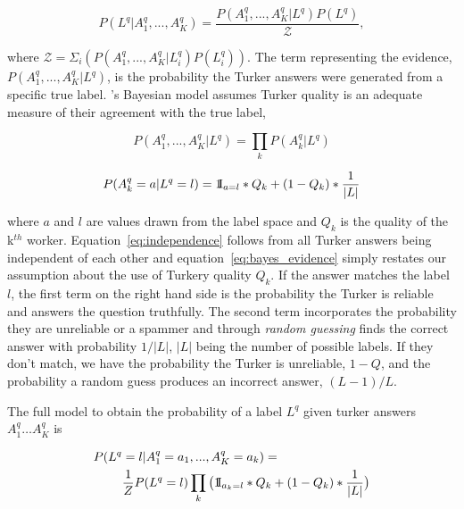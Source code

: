 \begin{equation}
P(L^{q}|A^{q}_{1},...,A^{q}_{K}) = \frac{P(A^{q}_{1},...,A^{q}_{K}|L^{q})P(L^{q})}{\mathcal{Z}},
\end{equation}

where $\mathcal{Z} = \Sigma_{i}(P(A^{q}_{1},...,A^{q}_{K}|L_{i}^{q})P(L_{i}^{q}))$.  The term representing the evidence, $P(A^{q}_{1},...,A^{q}_{K}|L^{q})$, is the probability the Turker answers were generated from a specific true label.  \sysName's Bayesian model assumes Turker quality is an adequate measure of their agreement with the true label,

\begin{equation}
\label{eq:independence}
P(A^{q}_{1},...,A^{q}_{K}|L^{q}) = \prod_{k}P(A^{q}_{k}|L^{q})
\end{equation}

\begin{equation}
\label{eq:bayes_evidence}
P(A^{q}_{k}=a|L^{q}=l) = 1{\hskip -2.5 pt}\hbox{I}_{{a}= l}* Q_{k} + (1-Q_{k})*\frac{1}{|L|}
\end{equation}

where $a$ and $l$ are values drawn from the label space and $Q_{k}$ is the quality of the k$^{th}$ worker.  Equation~\ref{eq:independence} follows from all Turker answers being independent of each other and equation~\ref{eq:bayes_evidence} simply restates our assumption about the use of Turkery quality $Q_{k}$.  If the answer matches the label $l$, the first term on the right hand side is the probability the Turker is reliable and answers the question truthfully.  The second term incorporates the probability they are unreliable or a spammer and through \textit{random guessing} finds the correct answer with probability $1/|L|$, $|L|$ being the number of possible labels.  If they don't match, we have the probability the Turker is unreliable, $1-Q$, and the probability a random guess produces an incorrect answer, $(L-1)/L$.
 
The full model to obtain the probability of a label $L^q$ given turker answers $A^{q}_1 \ldots A^{q}_K$ is

\begin{align}
\label{eq:full_bayes}
P(L^{q}&=l|A^{q}_{1}=a_{1},...,A^{q}_{K}=a_{k}) = \nonumber\\
                 &\frac{1}{Z}P(L^{q}=l)\prod_{k}\big(1{\hskip -2.5 pt}\hbox{I}_{{a_{k}}=l} *Q_{k}  + (1-Q_{k})*\frac{1}{|L|}\big)
\end{align}

